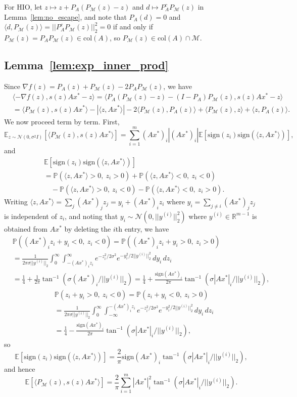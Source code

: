 \documentclass[journal]{IEEEtran}
\theoremstyle{definition}
\theoremstyle{remark}
\theoremstyle{definition}
\theoremstyle{problem}
\theoremstyle{definition}
\newcommand{\col}{\text{col}}
\newcommand{\sign}{\text{sign}}
\newcommand{\atan}{\tan^{-1}}
\newcommand{\RR}{\mathbb{R} }
\newcommand{\MM}{\mathcal{M}}
\newcommand{\PP}{\mathbb{P}}
\newcommand{\EE}{\mathbb{E}}
\begin{document}
For HIO, let $z\mapsto z + P_A(P_{\MM}(z)-z)$ and $d\mapsto P_A^cP_{\MM}(z)$ in Lemma~\ref{lem:no_escape}, and note that $P_A(d)=0$ and $\langle d,P_{\MM}(z)\rangle = ||P_A^cP_{\MM}(z)||_2^2 = 0$ if and only if $P_{\MM}(z)=P_AP_{\MM}(z)\in\col(A)$, so $P_{\MM}(z)\in\col(A)\cap\MM$.

\subsection{Lemma~\ref{lem:exp_inner_prod}}\label{sec:pf_exp_inner_prod}
Since $\nabla f(z) = P_A(z) + P_{\MM}(z) - 2P_AP_{\MM}(z)$, we have
\[\begin{aligned} &\langle -\nabla f(z), s(z)Ax^* - z\rangle = \langle P_A(P_{\MM}(z)-z) - (I-P_A)P_{\MM}(z), s(z)Ax^*-z\rangle
\\ &= \langle P_{\MM}(z), s(z)Ax^*\rangle - |\langle z, Ax^*\rangle| -2\langle P_{\MM}(z), P_A(z)\rangle + \langle P_{\MM}(z), z\rangle + \langle z, P_A(z)\rangle. \end{aligned}\]
We now proceed term by term. First,
\[ \EE_{z\sim \mathcal{N}(0,\sigma^2I)}\left[\langle P_{\MM}(z), s(z)Ax^*\rangle\right] = \sum_{i=1}^m(Ax^*)_i|(Ax^*)_i|\EE[\sign(z_i)\sign(\langle z,Ax^*\rangle)],\]
and
\[\begin{aligned}&\EE[\sign(z_i)\sign(\langle z,Ax^*\rangle)]\\
&= \PP(\langle z,Ax^*\rangle > 0,\ z_i>0) + \PP(\langle z,Ax^*\rangle < 0,\ z_i<0)\\
&\quad - \PP(\langle z,Ax^*\rangle > 0,\ z_i<0) - \PP(\langle z,Ax^*\rangle < 0,\ z_i>0).\end{aligned}\]
Writing $\langle z,Ax^*\rangle = \sum_j(Ax^*)_jz_j = y_i + (Ax^*)_iz_i$ where $y_i = \sum_{j\neq i}(Ax^*)_jz_j$ is independent of $z_i$, and noting that $y_i\sim \mathcal{N}(0, ||y^{(i)}||_2^2)$ where $y^{(i)}\in\RR^{m-1}$ is obtained from $Ax^*$ by deleting the $i$th entry, we have
\[\begin{aligned} &\PP((Ax^*)_iz_i + y_i < 0,\ z_i < 0) = \PP((Ax^*)_iz_i + y_i > 0,\ z_i > 0)\\
&= \frac{1}{2\pi\sigma||y^{(i)}||_2}\int_0^{\infty}\int_{-(Ax^*)_iz_i}^{\infty}e^{-z_i^2/2\sigma^2}e^{-y_i^2/2||y^{(i)}||_2^2}\, dy_i\, dz_i\\
&= \frac{1}{4} + \frac{1}{2\pi}\atan(\sigma(Ax^*)_i/||y^{(i)}||_2) = \frac{1}{4} + \frac{\sign(Ax^*)_i}{2\pi}\atan(\sigma|Ax^*|_i/||y^{(i)}||_2),\end{aligned}\]
\[\begin{aligned} &\PP(z_i + y_i > 0,\ z_i < 0) = \PP(z_i + y_i < 0,\ z_i > 0)\\
&= \frac{1}{2\pi\sigma||y^{(i)}||_2}\int_0^{\infty}\int_{-\infty}^{-(Ax^*)_iz_i}e^{-z_i^2/2\sigma^2}e^{-y_i^2/2||y^{(i)}||_2^2}\, dy_i\, dz_i\\
&= \frac{1}{4} - \frac{\sign(Ax^*)_i}{2\pi}\atan(\sigma|Ax^*|_i/||y^{(i)}||_2),\end{aligned}\]
so
\[ \EE[\sign(z_i)\sign(\langle z,Ax^*\rangle)] = \frac{2}{\pi}\sign(Ax^*)_i\atan(\sigma|Ax^*|_i/||y^{(i)}||_2),\]
and hence
\[\EE\left[\langle P_{\MM}(z), s(z)Ax^*\rangle\right] = \frac{2}{\pi}\sum_{i=1}^m|Ax^*|_i^2\atan(\sigma|Ax^*|_i/||y^{(i)}||_2).\]
\end{document}
